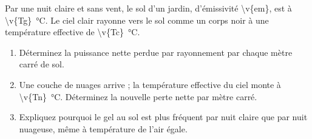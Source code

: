 Par une nuit claire et sans vent, le sol d'un jardin, d'émissivité \num{\v{em}}, est à \qty{\v{Tg}}{\degreeCelsius}. Le ciel clair rayonne vers le sol comme un corps noir à une température effective de \qty{\v{Tc}}{\degreeCelsius}.

\begin{enumerate}[label=\alph*)]
    \item Déterminez la puissance nette perdue par rayonnement par chaque mètre carré de sol.
    \item Une couche de nuages arrive ; la température effective du ciel monte à \qty{\v{Tn}}{\degreeCelsius}. Déterminez la nouvelle perte nette par mètre carré.
    \item Expliquez pourquoi le gel au sol est plus fréquent par nuit claire que par nuit nuageuse, même à température de l'air égale.
\end{enumerate}
